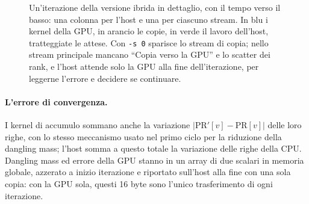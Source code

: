 \documentclass[11pt,a4paper]{article}
\begin{document}
\begin{figure}[htbp]
\caption{Un'iterazione della versione ibrida in dettaglio, con il tempo verso
il basso: una colonna per l'host e una per ciascuno stream.
In blu i kernel della GPU, in arancio le copie, in verde il lavoro
dell'host, tratteggiate le attese. Con \texttt{-s 0} sparisce lo stream di
copia; nello stream principale mancano ``Copia verso la GPU'' e lo scatter dei
rank, e l'host attende solo la GPU alla fine dell'iterazione, per leggerne
l'errore e decidere se continuare.}
\label{fig:iterazione}
\end{figure}

\paragraph{L'errore di convergenza.}
I kernel di accumulo sommano anche la variazione $|\mathrm{PR}'[v]-\mathrm{PR}[v]|$
delle loro righe, con lo stesso meccanismo usato nel primo ciclo per la
riduzione della dangling mass; l'host somma a questo totale la variazione
delle righe della CPU. Dangling mass ed errore della GPU stanno
in un array di due scalari in memoria globale, azzerato a inizio iterazione e
riportato sull'host alla fine con una sola copia: con la GPU sola, questi 16
byte sono l'unico trasferimento di ogni iterazione.
\end{document}
